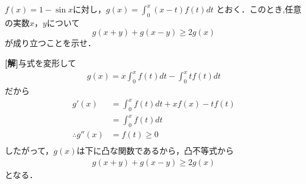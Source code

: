 \documentclass[a4j]{jarticle}
\begin{document}

\begin{oframed}
$f(x)=1-\sin x$に対し，$g(x)=\int_0^x(x-t)f(t)dt$ とおく．このとき,任意の実数$x$，$y$について
\[g(x+y)+g(x-y)\ge 2g(x)\]
が成り立つことを示せ．
\end{oframed}

\setlength{\columnseprule}{0.4pt}
\begin{multicols}{2}
{\bf[解]}与式を変形して
     \begin{align*}
     g(x)=x\int_0^xf(t)dt-\int_0^xtf(t)dt
     \end{align*}
だから
     \begin{align*}
     g'(x)&=\int_0^xf(t)dt+xf(x)-tf(t) \\
     &=\int_0^xf(t)dt \\
     \therefore g''(x)&=f(t)\ge0 \\
     \end{align*}
したがって，$g(x)$は下に凸な関数であるから，凸不等式から
     \begin{align*}
      g(x+y)+g(x-y)\ge 2g(x)
      \end{align*}
となる．      
\newpage
\end{multicols}
\end{document}
